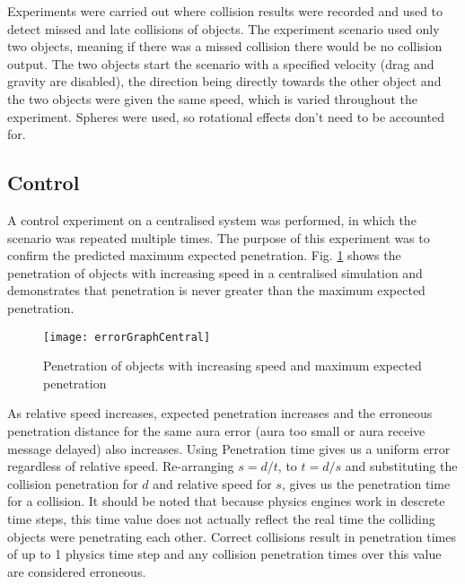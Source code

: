 


Experiments were carried out where collision results were recorded and used to detect missed and late collisions of objects. The experiment scenario used only two objects, meaning if there was a missed collision there would be no collision output. The two objects start the scenario with a specified velocity (drag and gravity are disabled), the direction being directly towards the other object and the two objects were given the same speed, which is varied throughout the experiment. Spheres were used, so rotational effects don't need to be accounted for.

\subsection{Control}

A control experiment on a centralised system was performed, in which the scenario was repeated multiple times. The purpose of this experiment was to confirm the predicted maximum expected penetration. Fig. \ref{fig_ErrorCentral} shows the penetration of objects with increasing speed in a centralised simulation and demonstrates that penetration is never greater than the maximum expected penetration.

\begin{figure}[!t]
	\centering
	\texttt{[image: errorGraphCentral]}
	\caption{Penetration of objects with increasing speed and maximum expected penetration}
	\label{fig_ErrorCentral}
\end{figure}

As relative speed increases, expected penetration increases and the erroneous penetration distance for the same aura error (aura too small or aura receive message delayed) also increases. Using Penetration time gives us a uniform error regardless of relative speed.
Re-arranging $s=d/t$, to $t=d/s$ and substituting the collision penetration for $d$ and relative speed for $s$, gives us the penetration time for a collision. It should be noted that because physics engines work in descrete time steps, this time value does not actually reflect the real time the colliding objects were penetrating each other. Correct collisions result in penetration times of up to 1 physics time step and any collision penetration times over this value are considered erroneous.

